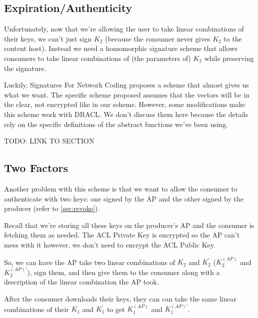 \documentclass[pdftex,12pt,a4papaer,twoside,notitlepage]{report}
\begin{document}
\subsection{Expiration/Authenticity}

Unfortunately, now that we're allowing the user to take linear combinations of
their keys, we can't just sign $K_2$ (because the consumer never gives $K_2$ to
the content host). Instead we need a homomorphic signature scheme that allows
consumers to take linear combinations of (the parameters of) $K_2$ while
preserving the signature.

Luckily, Signatures For Network Coding\cite{signature} proposes a scheme that
almost gives us what we want. The specific scheme proposed assumes that the
vectors will be in the clear, not encrypted like in our scheme. However, some
modifications make this scheme work with DRACL. We don't discuss them here
because the details rely on the specific definitions of the abstract functions
we've been using.


TODO: LINK TO SECTION

\subsection{Two Factors}

Another problem with this scheme is that we want to allow the consumer to
authenticate with two keys: one signed by the AP and the other signed by the
producer (refer to \cref{sec:revoke}).

Recall that we're storing all these keys on the producer's AP and the consumer
is fetching them as needed. The ACL Private Key is encrypted so the AP can't
mess with it however, we don't need to encrypt the ACL Public Key.

So, we can have the AP take two linear combinations of $K_2$ and $K_2^\prime$
($K^{(AP)}_2$ and $K^{(AP)\prime}_2$), sign them, and then give them to the
consumer along with a description of the linear combination the AP took.

After the consumer downloads their keys, they can can take the same linear
combinations of their $K_1$ and $K_1^\prime$ to get $K^{(AP)}_1$ and $K^{(AP)\prime}_1$.
\end{document}

